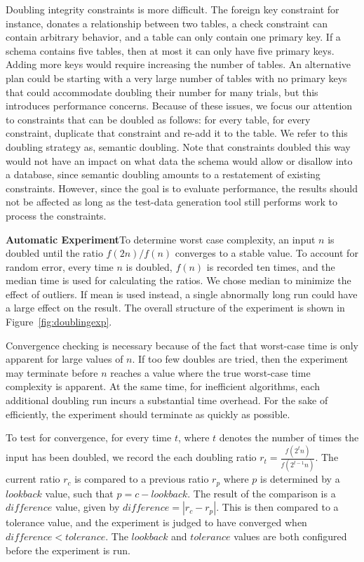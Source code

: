   Doubling integrity constraints is more difficult.  The foreign key constraint for instance, donates a relationship
  between two tables, a check constraint can contain arbitrary behavior, and a table can only contain one primary key.
  If a schema contains five tables, then at most it can only have five primary keys.  Adding more keys would require
  increasing the number of tables.  An alternative plan could be starting with a very large number of tables with no
  primary keys that could accommodate doubling their number for many trials, but this introduces performance concerns.
  Because of these issues, we focus our attention to constraints that can be doubled as follows: for every table, for
  every constraint, duplicate that constraint and re-add it to the table.  We refer to this doubling strategy as,
  semantic doubling.  Note that constraints doubled this way would not have an impact on what data the schema would
  allow or disallow into a database, since semantic doubling amounts to a restatement of existing constraints.  However,
  since the goal is to evaluate performance, the results should not be affected as long as the test-data generation tool
  still performs work to process the constraints.


  \textbf{Automatic Experiment}To determine worst case complexity, an input
  $n$ is doubled until the ratio $f(2n) / f(n)$ converges to a stable value.
  To account for random error, every time $n$ is doubled, $f(n)$ is recorded
  ten times, and the median time is used for calculating the ratios.  We chose
  median to minimize the effect of outliers. If mean is used instead, a
  single abnormally long run could have a large effect on the result. The
  overall structure of the experiment is shown in Figure~\ref{fig:doublingexp}.

  Convergence checking is necessary because of the fact that worst-case
  time is only apparent for large values of $n$. If too few doubles
  are tried, then the experiment may terminate before $n$ reaches a value
  where the true worst-case time complexity is apparent. At the same time,
  for inefficient  algorithms, each additional doubling run incurs a substantial
  time overhead. For the sake of efficiently, the experiment should
  terminate as quickly as possible.

  To test for convergence, for every time $t$, where $t$ denotes the
  number of times the input has been doubled, we record the each
  doubling ratio $r_t = \frac{f(2^t n)}{f(2^{t-1}n)}$. The current ratio
  $r_c$ is compared to a previous ratio $r_p$ where $p$ is determined by
  a $\mathit{lookback}$ value, such that $p=c-\mathit{lookback}$.  The
  result of the comparison is a $\mathit{difference}$ value, given by
  $\mathit{difference} = |r_c - r_p|$.  This is then compared to a
  tolerance value, and the experiment is judged to have converged when
  $\mathit{difference}<\mathit{tolerance}$.  The $\mathit{lookback}$ and
  $\mathit{tolerance}$ values are both configured before the experiment is
  run.

